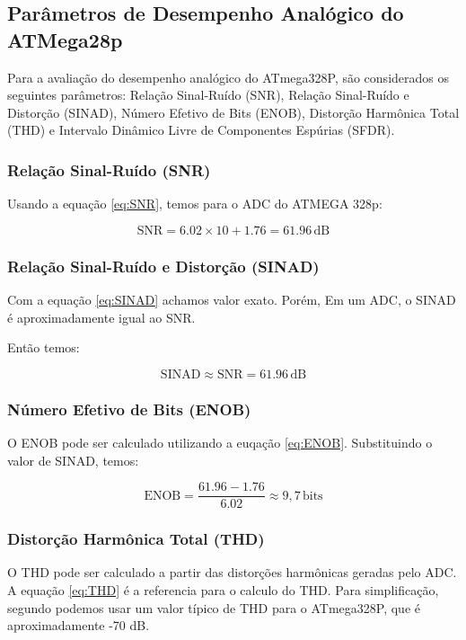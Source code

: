 \subsection{Parâmetros de Desempenho Analógico do ATMega28p}

Para a avaliação do desempenho analógico do ATmega328P, são considerados os seguintes parâmetros: Relação Sinal-Ruído (SNR), Relação Sinal-Ruído e Distorção (SINAD), Número Efetivo de Bits (ENOB), Distorção Harmônica Total (THD) e Intervalo Dinâmico Livre de Componentes Espúrias (SFDR).

\subsubsection{Relação Sinal-Ruído (SNR)}

Usando a equação \ref{eq:SNR}, temos para o ADC do ATMEGA 328p:

\[
\text{SNR} = 6.02 \times 10 + 1.76 = 61.96 \, \text{dB}
\]

\subsubsection{Relação Sinal-Ruído e Distorção (SINAD)}

Com a equação \ref{eq:SINAD} achamos  valor exato. Porém, Em um ADC, o SINAD é aproximadamente igual ao SNR.

Então temos:

\[
\text{SINAD} \approx \text{SNR} = 61.96 \, \text{dB}
\]

\subsubsection{Número Efetivo de Bits (ENOB)}

O ENOB pode ser calculado utilizando a euqação \ref{eq:ENOB}. Substituindo o valor de SINAD, temos:

\[
\text{ENOB} = \frac{61.96 - 1.76}{6.02} \approx 9,7 \, \text{bits}
\]


\subsubsection{Distorção Harmônica Total (THD)}

O THD pode ser calculado a partir das distorções harmônicas geradas pelo ADC. A equação \ref{eq:THD} é a referencia para o calculo do THD. Para simplificação, segundo \cite{atmega328p_datasheet} podemos usar um valor típico de THD para o ATmega328P, que é aproximadamente -70 dB.

